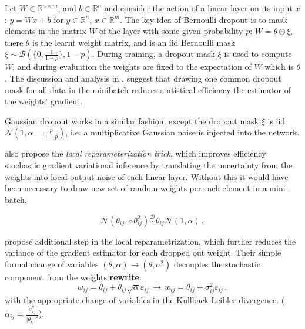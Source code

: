 \documentclass[a4paper,10pt]{article}
\newcommand{\important}[1]{\textbf{\color{red} #1}}
\newcommand{\rewrite}{\important{rewrite}}
\newcommand{\real}{\mathbb{R}}
\begin{document}
Let $W \in\real^{n\times m}$, and $b\in \real^n$ and consider the action of a linear
layer on its input $x$: $y = W x + b$ for $y\in \real^n$, $x\in \real^m$. The key idea
of Bernoulli dropout is to mask elements in the matrix $W$ of the layer with some given
probability $p$: $W = \theta \odot \xi$, there $\theta$ is the learnt weight matrix,
and is an iid Bernoulli mask $\xi \sim \mathcal{B}(\{0, \tfrac1{1-p}\}, 1-p)$. During
training, a dropout mask $\xi$ is used to compute $W$, and during evaluation the weights
are fixed to the expectation of $W$ which is $\theta$. The discussion and analysis in
\cite{kingma_variational_2015}, suggest that drawing one common dropout mask for all
data in the minibatch reduces statistical efficiency the estimator of the weights'
gradient.

Gaussian dropout works in a similar fashion, except the dropout mask $\xi$ is iid
$\mathcal{N}(1, \alpha=\tfrac{p}{1-p})$, i.e. a multiplicative Gaussian noise is
injected into the network.


\cite{kingma_variational_2015} also propose the \textit{local reparameterization trick},
which improves efficiency stochastic gradient variational inference by translating
the uncertainty from the weights into local output noise of each linear layer. Without
this it would have been necessary to draw new set of random weights per each element
in a mini-batch.

$$
  \mathcal{N}(\theta_{ij}, \alpha \theta^2_{ij})
  \overset{\mathcal{D}}{\sim}
  \theta_{ij} \mathcal{N}(1, \alpha)
  \,, $$

\cite{molchanov_variational_2017} propose additional step in the local reparametrization,
which further reduces the variance of the gradient estimator for each dropped out
weight. Their simple formal change of variables $(\theta, \alpha) \to (\theta, \sigma^2)$
decouples the stochastic component from the weights \rewrite:
$$
  w_{ij} = \theta_{ij} + \theta_{ij} \sqrt{\alpha} \varepsilon_{ij}
  \,\to\,
  w_{ij} = \theta_{ij} + \sigma^2_{ij} \varepsilon_{ij}
  \,, $$
with the appropriate change of variables in the Kullback-Leibler divergence.
($\alpha_{ij} = \tfrac{\sigma_{ij}^2}{\lvert \theta_{ij}\rvert^2}$).
\end{document}
